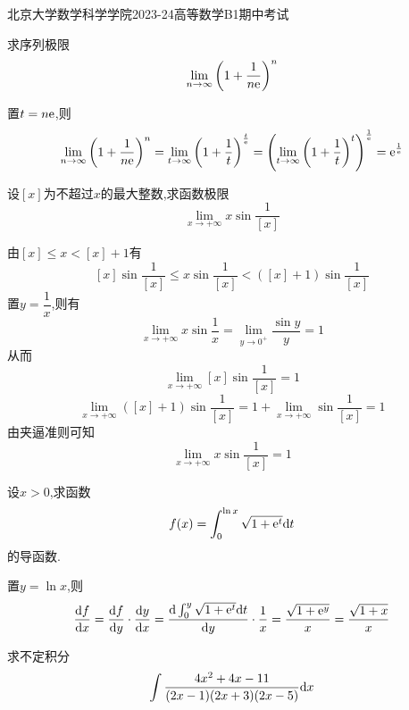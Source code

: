 \documentclass{ctexart}
\begin{document}
\pagestyle{empty}
\begin{center}\Large
    北京大学数学科学学院2023-24高等数学B1期中考试
\end{center}
\begin{problem}[1.(10分)]
    求序列极限$$\lim_{n\to\infty}{\left(1+\dfrac{1}{n\mathrm{e}}\right)^n}$$
\end{problem}
\begin{solution}[Solution.]
    置$t=n\mathrm{e}$,则
    $$
    \lim_{n\to\infty}{\left(1+\dfrac{1}{n\mathrm{e}}\right)^n}
    =\lim_{t\to\infty}{\left(1+\dfrac{1}{t}\right)^{\frac{t}{\mathrm{e}}}}
    =\left(\lim_{t\to\infty}{\left(1+\dfrac{1}{t}\right)^t}\right)^{\frac{1}{\mathrm{e}}}
    =\mathrm{e}^{\frac{1}{\mathrm{e}}}
    $$
\end{solution}
\begin{problem}[2.(10分)]
    设$[x]$为不超过$x$的最大整数,求函数极限$$\lim_{x\to+\infty}{x\sin{\dfrac{1}{[x]}}}$$
\end{problem}
\begin{solution}[Solution.]
    由$[x]\leqslant x<[x]+1$有
    $$[x]\sin{\dfrac{1}{[x]}}\leqslant x\sin{\dfrac{1}{[x]}}<([x]+1)\sin{\dfrac{1}{[x]}}$$
    置$y=\dfrac{1}{x}$,则有$$\lim_{x\to+\infty}{x\sin{\dfrac{1}{x}}}=\lim_{y\to 0^+}{\dfrac{\sin y}{y}}=1$$
    从而$$\lim_{x\to+\infty}{[x]\sin{\dfrac{1}{[x]}}}=1$$
    $$\lim_{x\to+\infty}{([x]+1)\sin{\dfrac{1}{[x]}}}=1+\lim_{x\to+\infty}{\sin{\dfrac{1}{[x]}}}=1$$
    由夹逼准则可知$$\lim_{x\to+\infty}{x\sin{\dfrac{1}{[x]}}}=1$$
\end{solution}
\begin{problem}[3.(10分)]
    设$x>0$,求函数$$f(x)=\int_{0}^{\ln{x}}{\sqrt{1+\mathrm{e}^t}\mathrm{d} t}$$的导函数.
\end{problem}
\begin{solution}[Solution.]
    置$y=\ln{x}$,则
    $$\dfrac{\mathrm{d} f}{\mathrm{d} x}=\dfrac{\mathrm{d} f}{\mathrm{d} y}\cdot\dfrac{\mathrm{d} y}{\mathrm{d} x}
    =\dfrac{\mathrm{d}\int_{0}^{y}{\sqrt{1+\mathrm{e}^t}\mathrm{d} t}}{\mathrm{d} y}\cdot\dfrac{1}{x}
    =\dfrac{\sqrt{1+\mathrm{e}^y}}{x}=\dfrac{\sqrt{1+x}}{x}$$
\end{solution}
\begin{problem}[4.(10分)]
    求不定积分$$\int{\dfrac{4x^2+4x-11}{(2x-1)(2x+3)(2x-5)}\mathrm{d}x}$$
\end{problem}
\end{document}
